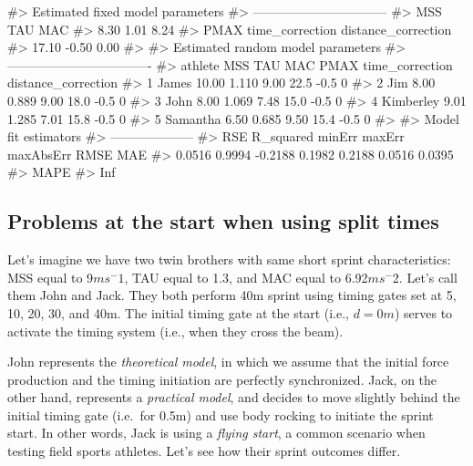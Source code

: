 \documentclass[
]{jss}
\begin{document}
\begin{CodeChunk}
\begin{CodeOutput}
#> Estimated fixed model parameters
#> --------------------------------
#>                 MSS                 TAU                 MAC 
#>                8.30                1.01                8.24 
#>                PMAX     time_correction distance_correction 
#>               17.10               -0.50                0.00 
#> 
#> Estimated random model parameters
#> ----------------------------------
#>     athlete   MSS   TAU  MAC PMAX time_correction distance_correction
#> 1     James 10.00 1.110 9.00 22.5            -0.5                   0
#> 2       Jim  8.00 0.889 9.00 18.0            -0.5                   0
#> 3      John  8.00 1.069 7.48 15.0            -0.5                   0
#> 4 Kimberley  9.01 1.285 7.01 15.8            -0.5                   0
#> 5  Samantha  6.50 0.685 9.50 15.4            -0.5                   0
#> 
#> Model fit estimators
#> --------------------
#>       RSE R_squared    minErr    maxErr maxAbsErr      RMSE       MAE 
#>    0.0516    0.9994   -0.2188    0.1982    0.2188    0.0516    0.0395 
#>      MAPE 
#>       Inf
\end{CodeOutput}
\end{CodeChunk}

\hypertarget{problems-at-the-start-when-using-split-times}{%
\subsection{Problems at the start when using split times}\label{problems-at-the-start-when-using-split-times}}

Let's imagine we have two twin brothers with same short sprint characteristics: MSS equal to 9\(ms^-1\), TAU equal to 1.3, and MAC equal to 6.92\(ms^-2\). Let's call them John and Jack. They both perform 40m sprint using timing gates set at 5, 10, 20, 30, and 40m. The initial timing gate at the start (i.e., \(d=0m\)) serves to activate the timing system (i.e., when they cross the beam).

John represents the \emph{theoretical model}, in which we assume that the initial force production and the timing initiation are perfectly synchronized. Jack, on the other hand, represents a \emph{practical model}, and decides to move slightly behind the initial timing gate (i.e.~for 0.5m) and use body rocking to initiate the sprint start. In other words, Jack is using a \emph{flying start}, a common scenario when testing field sports athletes. Let's see how their sprint outcomes differ.
\end{document}
